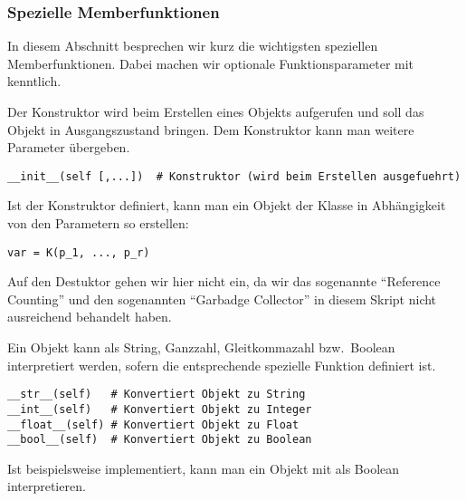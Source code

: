 \subsubsection{Spezielle Memberfunktionen}
In diesem Abschnitt besprechen wir kurz die wichtigsten speziellen Memberfunktionen.
Dabei machen wir optionale Funktionsparameter mit \lpy{[...]} kenntlich.

Der Konstruktor wird beim Erstellen eines Objekts aufgerufen und soll das Objekt in Ausgangszustand bringen.
Dem Konstruktor kann man weitere Parameter übergeben.
\begin{lstlisting}
__init__(self [,...])  # Konstruktor (wird beim Erstellen ausgefuehrt)
\end{lstlisting}
Ist der Konstruktor definiert, kann man ein Objekt der Klasse  in Abhängigkeit von den Parametern  so erstellen:
\begin{lstlisting}
var = K(p_1, ..., p_r)
\end{lstlisting}

Auf den Destuktor gehen wir hier nicht ein, da wir das sogenannte ``Reference Counting'' und den sogenannten ``Garbadge Collector''
in diesem Skript nicht ausreichend behandelt haben.

Ein Objekt kann als String, Ganzzahl, Gleitkommazahl bzw.\ Boolean interpretiert werden,
sofern die entsprechende spezielle Funktion definiert ist.
\begin{lstlisting}
__str__(self)   # Konvertiert Objekt zu String
__int__(self)   # Konvertiert Objekt zu Integer
__float__(self) # Konvertiert Objekt zu Float
__bool__(self)  # Konvertiert Objekt zu Boolean
\end{lstlisting}
Ist beispielsweise  implementiert, kann man ein Objekt  mit  als Boolean interpretieren.

